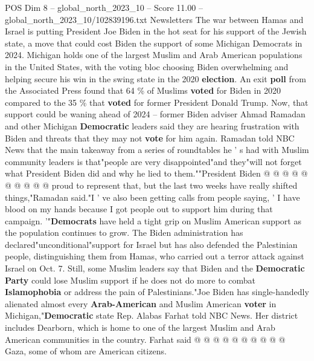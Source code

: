 \begin{textsample}{POS Dim 8 – global\_north\_2023\_10 – Score 11.00 – global\_north\_2023\_10/102839196.txt}  \label{ex:f8_pos_239}
Newsletters The war between Hamas and Israel is putting President Joe Biden in the hot seat for his support of the Jewish state, a move that could cost Biden the support of some Michigan Democrats in 2024.
Michigan holds one of the largest Muslim and Arab American populations in the United States, with the voting bloc choosing Biden overwhelming and helping secure his win in the swing state in the 2020 \textbf{election}.
An exit \textbf{poll} from the Associated Press found that 64 \% of Muslims \textbf{voted} for Biden in 2020 compared to the 35 \% that \textbf{voted} for former President Donald Trump.
Now, that support could be waning ahead of 2024 -- former Biden adviser Ahmad Ramadan and other Michigan \textbf{Democratic} leaders said they are hearing frustration with Biden and threats that they may not \textbf{vote} for him again.
Ramadan told NBC News that the main takeaway from a series of roundtables he ' s had with Muslim community leaders is that"people are very disappointed"and they"will not forget what President Biden did and why he lied to them.""President Biden @ @ @ @ @ @ @ @ @ @ proud to represent that, but the last two weeks have really shifted things,"Ramadan said."I ' ve also been getting calls from people saying, ' I have blood on my hands because I got people out to support him during that campaign. '"\textbf{Democrats} have held a tight grip on Muslim American support as the population continues to grow.
The Biden administration has declared"unconditional"support for Israel but has also defended the Palestinian people, distinguishing them from Hamas, who carried out a terror attack against Israel on Oct. 7.
Still, some Muslim leaders say that Biden and the \textbf{Democratic} \textbf{Party} could lose Muslim support if he does not do more to combat \textbf{Islamophobia} or address the pain of Palestinians."Joe Biden has single-handedly alienated almost every \textbf{Arab-American} and Muslim American \textbf{voter} in Michigan,"\textbf{Democratic} state Rep.
Alabas Farhat told NBC News.
Her district includes Dearborn, which is home to one of the largest Muslim and Arab American communities in the country.
Farhat said @ @ @ @ @ @ @ @ @ @ Gaza, some of whom are American citizens.

\end{textsample}
